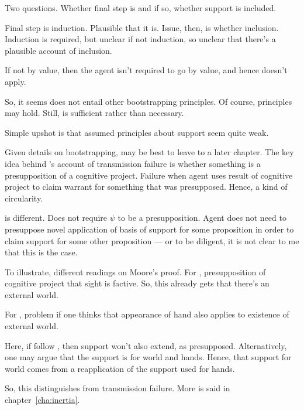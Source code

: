 \begin{note}
  Two questions.
  Whether final step is \RBV{} and if so, whether support is included.

  Final step is induction.
  Plausible that it is.
  Issue, then, is whether inclusion.
  Induction is required, but unclear if not induction, so unclear that there's a plausible account of inclusion.

  If not by value, then the agent isn't required to go by value, and hence \nI{} doesn't apply.

  So, it seems \nI{} does not entail other bootstrapping principles.
  Of course, principles may hold.
  Still, \nI{} is sufficient rather than necessary.

  Simple upshot is that assumed principles about support seem quite weak.
\end{note}

\begin{note}
  {
    \color{red}
    Given details on bootstrapping, may be best to leave \citeauthor{Wright:2011wn} to a later chapter.
  }
  The key idea behind \citeauthor{Wright:2011wn}'s account of transmission failure is whether something is a presupposition of a cognitive project.
  Failure when agent uses result of cognitive project to claim warrant for something that was presupposed.
  Hence, a kind of circularity.

  \nI{} is different.
  Does not require \(\psi\) to be a presupposition.
  Agent does not need to presuppose novel application of basis of support for some proposition in order to claim support for some other proposition --- or to be diligent, it is not clear to me that this is the case.

  To illustrate, different readings on Moore's proof.
  For \citeauthor{Wright:2011wn}, presupposition of cognitive project that sight is factive.
  So, this already gets that there's an external world.

  For \nI{}, problem if one thinks that appearance of hand also applies to existence of external world.

  Here, if follow \citeauthor{Wright:2011wn}, then support won't also extend, as presupposed.
  Alternatively, one may argue that the support is for world and hands.
  Hence, that support for world comes from a reapplication of the support used for hands.

  So, this distinguishes \nI{} from transmission failure.
  More is said in chapter~\ref{cha:inertia}.
\end{note}

